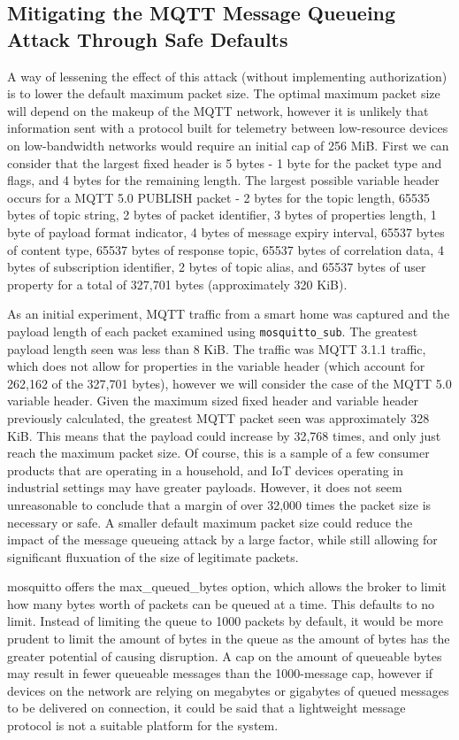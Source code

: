 \documentclass[12pt]{article}
\begin{document}
\subsection{Mitigating the MQTT Message Queueing Attack Through Safe Defaults}
A way of lessening the effect of this attack (without implementing authorization) is to lower the default maximum packet size. The optimal maximum packet size will depend on the makeup of the MQTT network, however it is unlikely that information sent with a protocol built for telemetry between low-resource devices on low-bandwidth networks would require an initial cap of 256 MiB. First we can consider that the largest fixed header is 5 bytes - 1 byte for the packet type and flags, and 4 bytes for the remaining length. The largest possible variable header occurs for a MQTT 5.0 PUBLISH packet - 2 bytes for the topic length, 65535 bytes of topic string, 2 bytes of packet identifier, 3 bytes of properties length, 1 byte of payload format indicator, 4 bytes of message expiry interval, 65537 bytes of content type, 65537 bytes of response topic, 65537 bytes of correlation data, 4 bytes of subscription identifier, 2 bytes of topic alias, and 65537 bytes of user property for a total of 327,701 bytes (approximately 320 KiB).\par
 As an initial experiment, MQTT traffic from a smart home was captured and the payload length of each packet examined using \texttt{mosquitto\_sub}. The greatest payload length seen was less than 8 KiB. The traffic was MQTT 3.1.1 traffic, which does not allow for properties in the variable header (which account for 262,162 of the 327,701 bytes), however we will consider the case of the MQTT 5.0 variable header. Given the maximum sized fixed header and variable header previously calculated, the greatest MQTT packet seen was approximately 328 KiB. This means that the payload could increase by 32,768 times, and only just reach the maximum packet size. Of course, this is a sample of a few consumer products that are operating in a household, and IoT devices operating in industrial settings may have greater payloads. However, it does not seem unreasonable to conclude that a margin of over 32,000 times the packet size is necessary or safe. A smaller default maximum packet size could reduce the impact of the message queueing attack by a large factor, while still allowing for significant fluxuation of the size of legitimate packets.\par
 mosquitto offers the max\_queued\_bytes option, which allows the broker to limit how many bytes worth of packets can be queued at a time. This defaults to no limit\cite{mosquitto-conf}. Instead of limiting the queue to 1000 packets by default, it would be more prudent to limit the amount of bytes in the queue as the amount of bytes has the greater potential of causing disruption. A cap on the amount of queueable bytes may result in fewer queueable messages than the 1000-message cap, however if devices on the network are relying on megabytes or gigabytes of queued messages to be delivered on connection, it could be said that a lightweight message protocol is not a suitable platform for the system.\par
\end{document}
